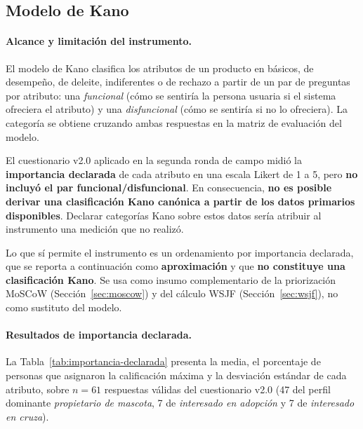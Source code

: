\documentclass[journal,onecolumn]{IEEEtran}
\begin{document}
	\subsection{Modelo de Kano}
	\label{sec:kano}
	
	\paragraph{Alcance y limitación del instrumento.}
	El modelo de Kano \cite{kano1984} clasifica los atributos de un producto en
	básicos, de desempeño, de deleite, indiferentes o de rechazo a partir de un
	par de preguntas por atributo: una \emph{funcional} (cómo se sentiría la
	persona usuaria si el sistema ofreciera el atributo) y una
	\emph{disfuncional} (cómo se sentiría si no lo ofreciera). La categoría se
	obtiene cruzando ambas respuestas en la matriz de evaluación del modelo.
	
	El cuestionario v2.0 aplicado en la segunda ronda de campo midió la
	\textbf{importancia declarada} de cada atributo en una escala Likert de 1 a
	5, pero \textbf{no incluyó el par funcional/disfuncional}. En consecuencia,
	\textbf{no es posible derivar una clasificación Kano canónica a partir de
		los datos primarios disponibles}. Declarar categorías Kano sobre estos datos
	sería atribuir al instrumento una medición que no realizó.
	
	Lo que sí permite el instrumento es un ordenamiento por importancia
	declarada, que se reporta a continuación como \textbf{aproximación} y que
	\textbf{no constituye una clasificación Kano}. Se usa como insumo
	complementario de la priorización MoSCoW (Sección~\ref{sec:moscow}) y del
	cálculo WSJF (Sección~\ref{sec:wsjf}), no como sustituto del modelo.
	
	\paragraph{Resultados de importancia declarada.}
	La Tabla~\ref{tab:importancia-declarada} presenta la media, el porcentaje de
	personas que asignaron la calificación máxima y la desviación estándar de
	cada atributo, sobre $n = 61$ respuestas válidas del cuestionario v2.0
	(47 del perfil dominante \emph{propietario de mascota}, 7 de
	\emph{interesado en adopción} y 7 de \emph{interesado en cruza}).
	
\end{document}
